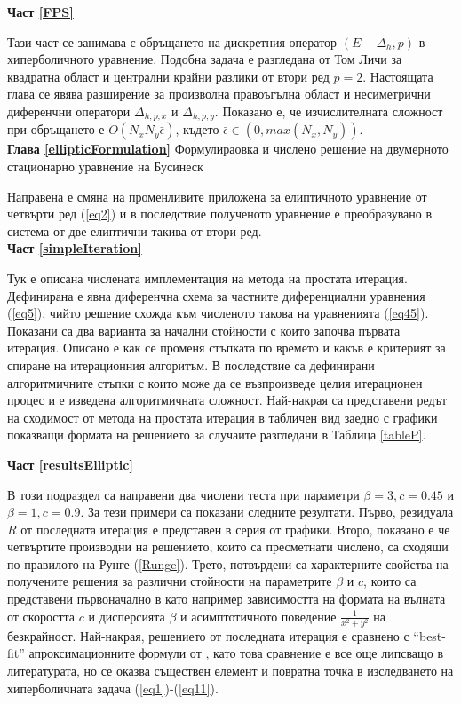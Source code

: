 \documentclass[a4paper]{article}
\newcommand{\rf}[1]{(\ref{#1})}
\theoremstyle{remark}
\begin{document}
\textbf{Част \ref{FPS}}

Тази част се занимава с обръщането на дискретния оператор $(E-\Delta_h,p)$ в хиперболичното уравнение. Подобна задача е разгледана от Том Личи за квадратна област и централни крайни разлики от втори ред $p=2$. Настоящата глава се явява разширение за произволна правоъгълна област и несиметрични диференчни оператори $\Delta_{h,p,x}$ и $\Delta_{h,p,y}$. Показано е, че изчислителната сложност при обръщането е $O(N_x N_y \bar{\epsilon})$, където $\bar{\epsilon} \in (0, max(N_x, N_y))$.\\


\textbf{Глава \ref{ellipticFormulation}} Формулираовка и числено решение на двумерното стационарно уравнение на Бусинеск

Направена е смяна на променливите приложена за елиптичното уравнение от четвърти ред \rf{eq2} и в последствие полученото уравнение е преобразувано в система от две елиптични такива от втори ред. \\

\textbf{Част \ref{simpleIteration}}

Тук е описана числената имплементация на метода на простата итерация. Дефинирана е явна диференчна схема за частните диференциални уравнения \rf{eq5}, чийто решение схожда към численото такова на уравненията \rf{eq45}. Показани са два варианта за начални стойности с които започва първата итерация. Описано е как се променя стъпката по времето и какъв е критерият за спиране на итерационния алгоритъм. В последствие са дефинирани алгоритмичните стъпки с които може да се възпроизведе целия итерационен процес и е изведена алгоритмичната сложност. Най-накрая са представени редът на сходимост от метода на простата итерация в табличен вид заедно с графики показващи формата на решението за случаите разгледани в Таблица \ref{tableP}. 


\textbf{Част \ref{resultsElliptic}}

В този подраздел са направени два числени теста при параметри $\beta = 3, c=0.45$ и $\beta = 1, c=0.9$. За тези примери са показани следните резултати. Първо, резидуала $R$ от последната итерация е представен в серия от графики. Второ, показано е че четвъртите производни на решението, които са пресметнати числено, са сходящи по правилото на Рунге \rf{Runge}. Трето, потвърдени са характерните свойства на получените решения за различни стойности на параметрите $\beta$ и $c$, които са представени първоначално в \cite{ref116,Ch2011} като например зависимостта на формата на вълната от скоростта $c$ и дисперсията $\beta$ и асимптотичното поведение $\frac{1}{x^2 + y^2}$ на безкрайност. Най-накрая, решението от последната итерация е сравнено с ``best-fit'' апроксимационните формули от \cite{Ch2011}, като това сравнение е все още липсващо в литературата, но се оказва съществен елемент и повратна точка в изследването на хиперболичната задача \rf{eq1}-\rf{eq11}. 
\end{document}
